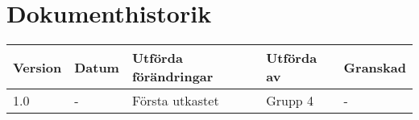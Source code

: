 \documentclass[11pt]{article}
\begin{document}
\tableofcontents

\pagebreak

\section*{Dokumenthistorik}
\begin{table}[h]
\begin{tabular}{|l|l|l|l|l|} \hline

\textbf{Version} & \textbf{Datum} & \textbf{Utförda förändringar} & \textbf{Utförda av} & \textbf{Granskad} \\ \hline
1.0 & - &  Första utkastet & Grupp 4 & - \\ \hline
\end{tabular}
\end{table}

\pagebreak
{}
\end{document}
